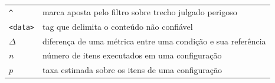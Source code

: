 \begin{longtable}{ll}
\texttt{\^{}} & marca aposta pelo filtro sobre trecho julgado perigoso \\
\texttt{<data>} & tag que delimita o conteúdo não confiável \\
$\Delta$ & diferença de uma métrica entre uma condição e sua referência \\
$n$ & número de itens executados em uma configuração \\
$p$ & taxa estimada sobre os itens de uma configuração \\
\end{longtable}
